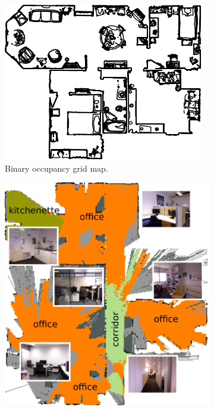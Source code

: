 \begin{figure}[h!]
	\centering
	\begin{subfigure}[b]{0.5\linewidth}
		\centering
		\includegraphics[width=\textwidth]{images/occupancygrid.png}
		\caption{Binary occupancy grid map.}
		\label{fig:binary_grid_map}
	\end{subfigure}
	\hfill
	\begin{subfigure}[b]{0.45\linewidth}
		\centering
		\includegraphics[width=\textwidth]{images/semanticmap.png}

\end{subfigure}
\end{figure}
